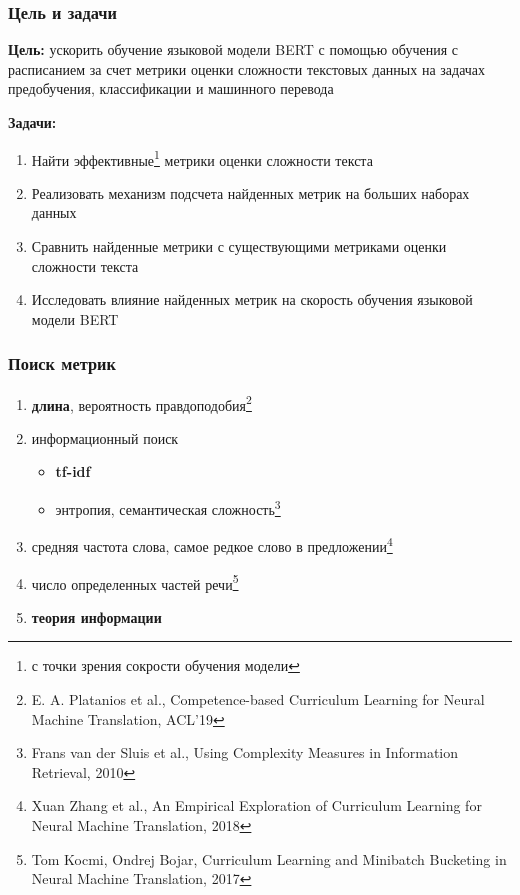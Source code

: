 \documentclass{beamer}
\begin{document}
\begin{frame}
	\frametitle{Цель и задачи}
	{\bf Цель:} ускорить обучение языковой модели BERT с помощью обучения с расписанием за счет метрики оценки сложности текстовых данных на задачах предобучения, классификации и машинного перевода

	{\bf Задачи:}
	\begin{enumerate}
		\item Найти эффективные\footnote[1]{с точки зрения сокрости обучения модели} метрики оценки сложности текста
		\item Реализовать механизм подсчета найденных метрик на больших наборах данных
		\item Сравнить найденные метрики с существующими метриками оценки сложности текста
		\item Исследовать влияние найденных метрик на скорость обучения языковой модели BERT
	\end{enumerate}
\end{frame}

\begin{frame}
	\frametitle{Поиск метрик}
	\begin{enumerate}
		\item {\bf длина}, вероятность правдоподобия\footnote[1]{E. A. Platanios et al., Competence-based Curriculum Learning for Neural Machine Translation, ACL'19}
		\item информационный поиск
			\begin{itemize}
				\item {\bf tf-idf}
				\item энтропия, семантическая сложность\footnote[2]{Frans van der Sluis et al., Using Complexity Measures in Information Retrieval, 2010}
			\end{itemize}
		\item средняя частота слова, самое редкое слово в предложении\footnote[3]{Xuan Zhang et al., An Empirical Exploration of Curriculum Learning for Neural Machine Translation, 2018}
		\item число определенных частей речи\footnote[4]{Tom Kocmi, Ondrej Bojar, Curriculum Learning and Minibatch Bucketing in Neural Machine Translation, 2017}
		\item {\bf теория информации}
	\end{enumerate}
\end{frame}
\end{document}
